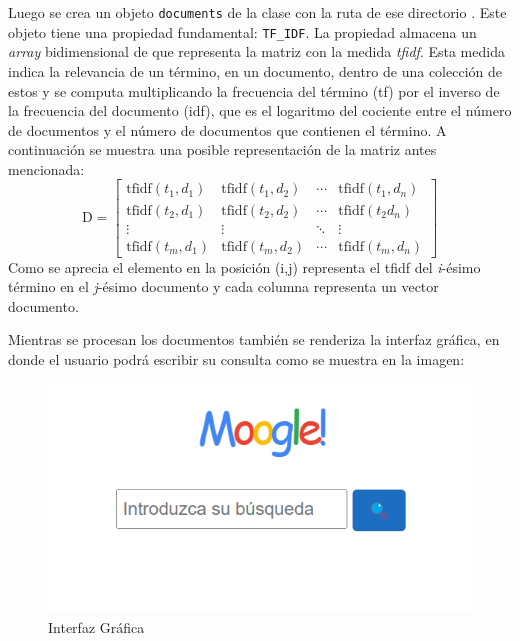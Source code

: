 \documentclass{beamer}
\begin{document}
\begin{frame}
Luego se crea un objeto \texttt{documents} de la clase  con la ruta de ese directorio . Este objeto tiene una propiedad fundamental: \texttt{TF\_IDF}. La propiedad almacena un \textit{array} bidimensional de  que representa la matriz con la medida \textit{tfidf}. Esta medida indica la relevancia de un término, en un documento, dentro de una colección de estos y se computa multiplicando la frecuencia del término (tf) por el inverso de la frecuencia del documento (idf), que es el logaritmo del cociente entre el número de documentos y el número de documentos que contienen el término. A continuación se muestra una posible representación de la matriz antes mencionada:
\begin{equation*}
\label{eq:matriztfidf}
\text{D} =
\begin{bmatrix}
\text{tfidf}(t_1, d_1) & \text{tfidf}(t_1, d_2) & \cdots & \text{tfidf}(t_1, d_n) \\
\text{tfidf}(t_2, d_1) & \text{tfidf}(t_2, d_2) & \cdots & \text{tfidf}(t_2 d_n) \\
\vdots & \vdots & \ddots & \vdots \\
\text{tfidf}(t_m, d_1) & \text{tfidf}(t_m, d_2) & \cdots & \text{tfidf}(t_m, d_n)
\end{bmatrix}
\end{equation*}
Como se aprecia el elemento en la posición (i,j) representa el tfidf del \textit{i}-ésimo término en el \textit{j}-ésimo documento y cada columna representa un vector documento.

\end{frame}
\begin{frame}
    Mientras se procesan los documentos también se renderiza la interfaz gráfica, en donde el usuario podrá escribir su consulta como se muestra en la imagen:


    \begin{figure}
        \centering
        \includegraphics[width=0.75\linewidth]{ui.png}
        \caption{Interfaz Gráfica}
        \label{fig:ui}
    \end{figure}
\end{frame}
\end{document}
